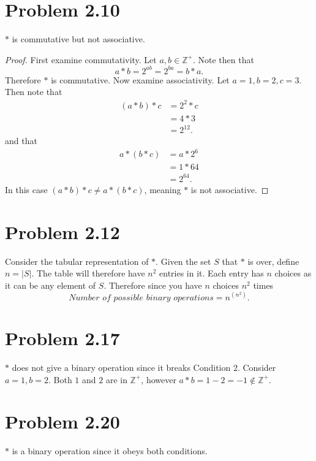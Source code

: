 \documentclass[12pt]{extarticle}
\begin{document}
\section*{Problem 2.10}

$*$ is commutative but not associative.

\begin{proof}
	First examine commutativity. Let $a,b \in \mathbb{Z}^+$. Note then that
	\[
		a * b = 2^{ab} = 2^{ba} = b * a
	.\]
	Therefore $*$ is commutative. Now examine associativity. Let $a = 1, b = 2, c = 3$. Then note that
	\begin{align*}
		(a * b) * c &= 2^{2} * c \\
								&= 4 * 3 \\
								&= 2^{12}
	.\end{align*}
	and that
	\begin{align*}
		a * (b * c) &= a * 2^{6} \\
								&= 1 * 64 \\
								&= 2^{64}
	.\end{align*}
	In this case $(a * b) * c \neq a * (b * c)$, meaning $*$ is not associative.
\end{proof}

\section*{Problem 2.12}

Consider the tabular representation of $*$. Given the set $S$ that $*$ is over, define $n = |S|$. The table will therefore have $n^2$ entries in it. Each entry has $n$ choices as it can be any element of $S$. Therefore since you have $n$ choices $n^2$ times
\[
	\textit{Number of possible binary operations} = n^{(n^2)}
.\]

\section*{Problem 2.17}

$*$ does not give a binary operation since it breaks Condition $2$. Consider $a = 1, b = 2$. Both $1$ and $2$ are in $\mathbb{Z}^+$, however $a * b = 1 - 2 = -1 \notin \mathbb{Z}^+$.

\section*{Problem 2.20}

$*$ is a binary operation since it obeys both conditions.
\end{document}
